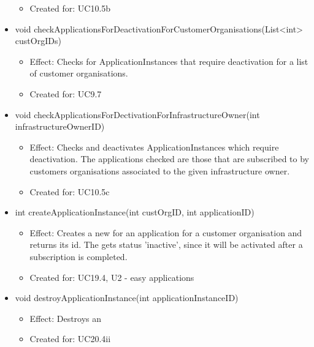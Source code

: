 \begin{description}
\begin{itemize}[noitemsep,nolistsep,leftmargin=-.25cm]
\begin{itemize}[noitemsep,nolistsep]
\item Created for: UC10.5b
        \end{itemize}
      \item \textsf{void checkApplicationsForDeactivationForCustomerOrganisations(List\textless{}int\textgreater{} custOrgIDs)}
        \begin{itemize}[noitemsep,nolistsep]
           \item Effect: Checks for ApplicationInstances that require deactivation for a list of customer organisations.
\item Created for: UC9.7
        \end{itemize}
      \item \textsf{void checkApplicationsForDectivationForInfrastructureOwner(int infrastructureOwnerID)}
        \begin{itemize}[noitemsep,nolistsep]
           \item Effect: Checks and deactivates ApplicationInstances which require deactivation. The applications checked are those that are subscribed to by customers organisations associated to the given infrastructure owner.
\item Created for: UC10.5c
        \end{itemize}
      \item \textsf{int createApplicationInstance(int custOrgID, int applicationID)}
        \begin{itemize}[noitemsep,nolistsep]
           \item Effect: Creates a new  for an application for a customer organisation and returns its id. The  gets status 'inactive', since it will be activated after a subscription is completed.
\item Created for: UC19.4, U2 - easy applications
        \end{itemize}
      \item \textsf{void destroyApplicationInstance(int applicationInstanceID)}
        \begin{itemize}[noitemsep,nolistsep]
           \item Effect: Destroys an 
\item Created for: UC20.4ii
        \end{itemize}

\end{itemize}
\end{description}
